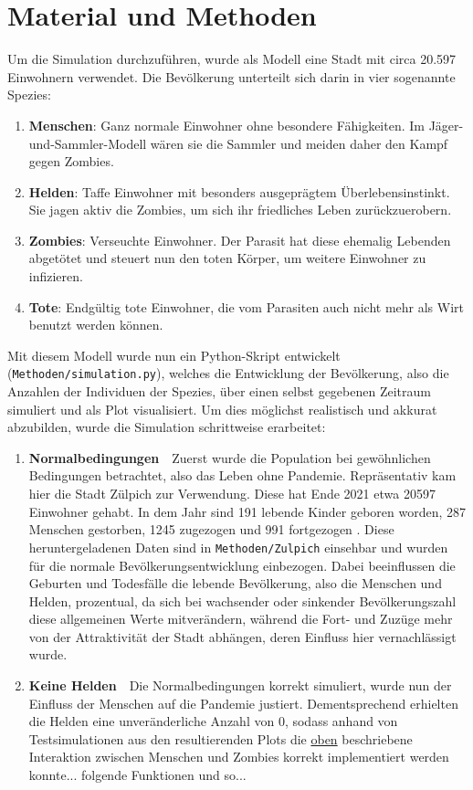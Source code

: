 \section{Material und Methoden} %
    \label{sec:material_und_methoden}
    Um die Simulation durchzuführen, wurde als Modell eine Stadt mit circa 20.597 Einwohnern verwendet. Die Bevölkerung unterteilt sich darin in vier sogenannte Spezies:
    \begin{enumerate}[1.]
        \item \textbf{Menschen}: Ganz normale Einwohner ohne besondere Fähigkeiten. Im Jäger-und-Sammler-Modell wären sie die Sammler und meiden daher den Kampf gegen Zombies.\label{species}
        \item \textbf{Helden}: Taffe Einwohner mit besonders ausgeprägtem Überlebensinstinkt. Sie jagen aktiv die Zombies, um sich ihr friedliches Leben zurückzuerobern.
        \item \textbf{Zombies}: Verseuchte Einwohner. Der Parasit hat diese ehemalig Lebenden abgetötet und steuert nun den toten Körper, um weitere Einwohner zu infizieren.
        \item \textbf{Tote}: Endgültig tote Einwohner, die vom Parasiten auch nicht mehr als Wirt benutzt werden können.
    \end{enumerate}
    Mit diesem Modell wurde nun ein Python-Skript entwickelt (\texttt{Methoden/simulation.py}), welches die Entwicklung der Bevölkerung, also die Anzahlen der Individuen der Spezies, über einen selbst gegebenen Zeitraum simuliert und als Plot visualisiert. Um dies möglichst realistisch und akkurat abzubilden, wurde die Simulation schrittweise erarbeitet:
    \begin{enumerate}[1.]
        \item \textbf{Normalbedingungen}\ \ Zuerst wurde die Population bei gewöhnlichen Bedingungen betrachtet, also das Leben ohne Pandemie. Repräsentativ kam hier die Stadt Zülpich zur Verwendung. Diese hat Ende 2021 etwa 20597 Einwohner gehabt. In dem Jahr sind 191 lebende Kinder geboren worden, 287 Menschen gestorben, 1245 zugezogen und 991 fortgezogen \cite{zulpich}. Diese heruntergeladenen Daten sind in \texttt{Methoden/Zulpich} einsehbar und wurden für die normale Bevölkerungsentwicklung einbezogen. Dabei beeinflussen die Geburten und Todesfälle die lebende Bevölkerung, also die Menschen und Helden, prozentual, da sich bei wachsender oder sinkender Bevölkerungszahl diese allgemeinen Werte mitverändern, während die Fort- und Zuzüge mehr von der Attraktivität der Stadt abhängen, deren Einfluss hier vernachlässigt wurde.
        \item \textbf{Keine Helden}\ \ Die Normalbedingungen korrekt simuliert, wurde nun der Einfluss der Menschen auf die Pandemie justiert. Dementsprechend erhielten die Helden eine unveränderliche Anzahl von 0, sodass anhand von Testsimulationen aus den resultierenden Plots die \hyperref[species]{oben} beschriebene Interaktion zwischen Menschen und Zombies korrekt implementiert werden konnte... folgende Funktionen und so...
    \end{enumerate}

